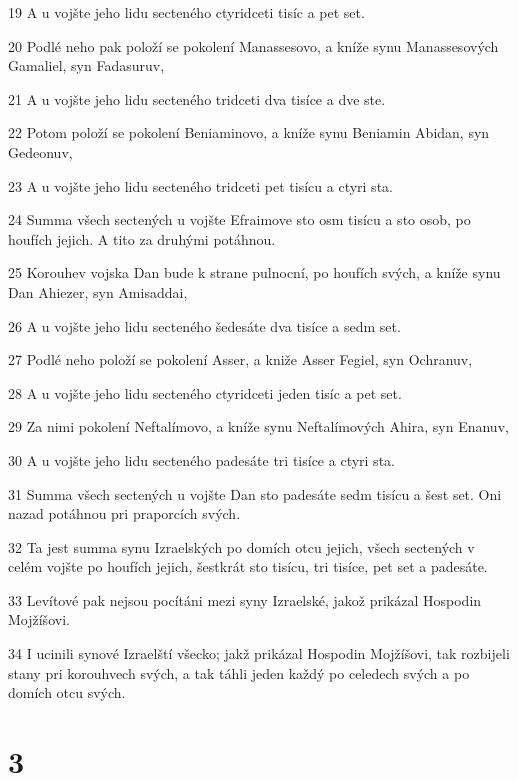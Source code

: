\par 19 A u vojšte jeho lidu secteného ctyridceti tisíc a pet set.
\par 20 Podlé neho pak položí se pokolení Manassesovo, a kníže synu Manassesových Gamaliel, syn Fadasuruv,
\par 21 A u vojšte jeho lidu secteného tridceti dva tisíce a dve ste.
\par 22 Potom položí se pokolení Beniaminovo, a kníže synu Beniamin Abidan, syn Gedeonuv,
\par 23 A u vojšte jeho lidu secteného tridceti pet tisícu a ctyri sta.
\par 24 Summa všech sectených u vojšte Efraimove sto osm tisícu a sto osob, po houfích jejich. A tito za druhými potáhnou.
\par 25 Korouhev vojska Dan bude k strane pulnocní, po houfích svých, a kníže synu Dan Ahiezer, syn Amisaddai,
\par 26 A u vojšte jeho lidu secteného šedesáte dva tisíce a sedm set.
\par 27 Podlé neho položí se pokolení Asser, a kniže Asser Fegiel, syn Ochranuv,
\par 28 A u vojšte jeho lidu secteného ctyridceti jeden tisíc a pet set.
\par 29 Za nimi pokolení Neftalímovo, a kníže synu Neftalímových Ahira, syn Enanuv,
\par 30 A u vojšte jeho lidu secteného padesáte tri tisíce a ctyri sta.
\par 31 Summa všech sectených u vojšte Dan sto padesáte sedm tisícu a šest set. Oni nazad potáhnou pri praporcích svých.
\par 32 Ta jest summa synu Izraelských po domích otcu jejich, všech sectených v celém vojšte po houfích jejich, šestkrát sto tisícu, tri tisíce, pet set a padesáte.
\par 33 Levítové pak nejsou pocítáni mezi syny Izraelské, jakož prikázal Hospodin Mojžíšovi.
\par 34 I ucinili synové Izraelští všecko; jakž prikázal Hospodin Mojžíšovi, tak rozbijeli stany pri korouhvech svých, a tak táhli jeden každý po celedech svých a po domích otcu svých.

\chapter{3}

